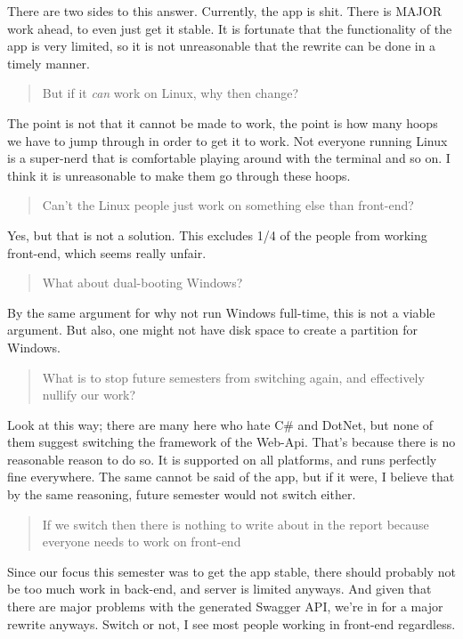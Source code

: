 There are two sides to this answer. Currently, the app is shit. There is
MAJOR work ahead, to even just get it stable. It is fortunate that the
functionality of the app is very limited, so it is not unreasonable that
the rewrite can be done in a timely manner.

\begin{quote}
But if it \emph{can} work on Linux, why then change?
\end{quote}

The point is not that it cannot be made to work, the point is how many
hoops we have to jump through in order to get it to work. Not everyone
running Linux is a super-nerd that is comfortable playing around with
the terminal and so on. I think it is unreasonable to make them go
through these hoops.

\begin{quote}
Can't the Linux people just work on something else than front-end?
\end{quote}

Yes, but that is not a solution. This excludes 1/4 of the people from
working front-end, which seems really unfair.

\begin{quote}
What about dual-booting Windows?
\end{quote}

By the same argument for why not run Windows full-time, this is not a
viable argument. But also, one might not have disk space to create a
partition for Windows.

\begin{quote}
What is to stop future semesters from switching again, and effectively
nullify our work?
\end{quote}

Look at this way; there are many here who hate C\# and DotNet, but none
of them suggest switching the framework of the Web-Api. That's because
there is no reasonable reason to do so. It is supported on all
platforms, and runs perfectly fine everywhere. The same cannot be said
of the app, but if it were, I believe that by the same reasoning, future
semester would not switch either.

\begin{quote}
If we switch then there is nothing to write about in the report because
everyone needs to work on front-end
\end{quote}

Since our focus this semester was to get the app stable, there should
probably not be too much work in back-end, and server is limited
anyways. And given that there are major problems with the generated
Swagger API, we're in for a major rewrite anyways. Switch or not, I see
most people working in front-end regardless.

